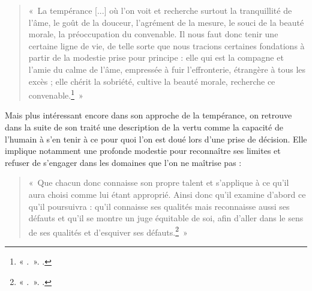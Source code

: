 \begin{quote}
«~La tempérance [...] où l'on voit et recherche surtout la tranquillité de l'âme, le goût de la douceur, l'agrément de la mesure, le souci de la beauté morale, la préoccupation du convenable. Il nous faut donc tenir une certaine ligne de vie, de telle sorte que nous tracions certaines fondations à partir de la modestie prise pour principe : elle qui est la compagne et l’amie du calme de l’âme, empressée à fuir l’effronterie, étrangère à tous les excès ; elle chérit la sobriété, cultive la beauté morale, recherche ce convenable.\footnote{« .~». \cite[\nopp I, 210-211]{ambroise_devoirs_1}.}~»
\end{quote}

\bigskip

Mais plus intéressant encore dans son approche de la tempérance, on retrouve dans la suite de son traité une description de la vertu comme la capacité de l'humain à s'en tenir à ce pour quoi l'on est doué lors d'une prise de décision. Elle implique notamment une profonde modestie pour reconnaître ses limites et refuser de s'engager dans les domaines que l'on ne maîtrise pas :

\bigskip

\begin{quote}
«~Que chacun donc connaisse son propre talent et s'applique à ce qu'il aura choisi comme lui étant approprié. Ainsi donc qu'il examine d'abord ce qu'il poursuivra : qu'il connaisse ses qualités mais reconnaisse aussi ses défauts et qu'il se montre un juge équitable de soi, afin d'aller dans le sens de ses qualités et d'esquiver ses défauts.\footnote{« .~». \cite[\nopp I, 215]{ambroise_devoirs_1}.}~»
\end{quote}

\bigskip


